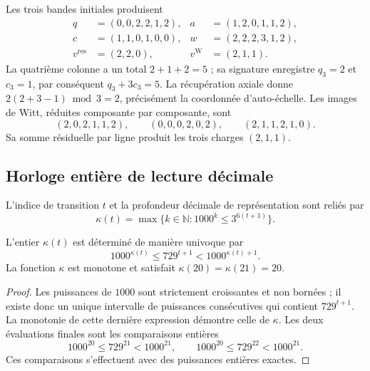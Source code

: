 \begin{example}
Les trois bandes initiales produisent
\begin{align*}
 q&=(0,0,2,2,1,2),&a&=(1,2,0,1,1,2),\\
 c&=(1,1,0,1,0,0),&w&=(2,2,2,3,1,2),\\
 v^{\mathrm{res}}&=(2,2,0),&v^{\mathrm W}&=(2,1,1).
\end{align*}
La quatrième colonne a un total \(2+1+2=5\) ; sa signature enregistre \(q_3=2\) et \(c_3=1\), par conséquent \(q_3+3c_3=5\).
La récupération axiale donne \(2(2+3-1)\bmod3=2\), précisément la coordonnée d'auto-échelle.
Les images de Witt, réduites composante par composante, sont
\[
 (2,0,2,1,1,2),\qquad
 (0,0,0,2,0,2),\qquad
 (2,1,1,2,1,0).
\]
Sa somme résiduelle par ligne produit les trois charges \((2,1,1)\).
\end{example}



\subsection{Horloge entière de lecture décimale}

\begin{definition}
L'indice de transition \(t\) et la profondeur décimale de représentation sont
reliés par
\begin{equation}
 \kappa(t)=\max\{k\in\mathbb N:1000^k\leq3^{6(t+1)}\}.
 \label{act21:eq:df-reloj}
\end{equation}
\end{definition}

\begin{proposition}
\label{act21:prop:df-reloj}
L'entier \(\kappa(t)\) est déterminé de manière univoque par
\begin{equation}
 1000^{\kappa(t)}\leq729^{t+1}<1000^{\kappa(t)+1}.
 \label{act21:eq:df-reloj-cotas}
\end{equation}
La fonction \(\kappa\) est monotone et satisfait
\(\kappa(20)=\kappa(21)=20\).
\end{proposition}

\begin{proof}
Les puissances de \(1000\) sont strictement croissantes et non bornées ;
il existe donc un unique intervalle de puissances consécutives qui
contient \(729^{t+1}\). La monotonie de cette dernière expression démontre
celle de \(\kappa\). Les deux évaluations finales sont les comparaisons
entières
\[
 1000^{20}\leq729^{21}<1000^{21},\qquad
 1000^{20}\leq729^{22}<1000^{21}.
\]
Ces comparaisons s'effectuent avec des puissances entières exactes.
\end{proof}

